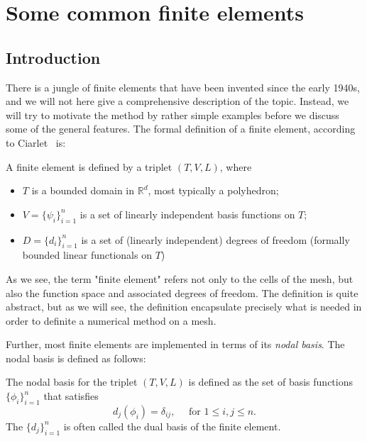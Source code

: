 \chapter{Some common finite elements}
\label{element}

\section{Introduction}

There is a jungle of finite elements that have been invented since the early 1940s, and we
will not here give a comprehensive description of the topic. Instead, we will try to motivate
the method by rather simple examples before we discuss some of the general features. 
The formal definition of a finite element, according to Ciarlet~\cite{ciarlet2002finite} is: 

\begin{defin}
A finite element is defined by a triplet $(T, V, L)$, where 
\begin{itemize}
\item $T$ is a bounded domain in $\mathbb{R}^d$, most typically a polyhedron; 
\item $V = \{\psi_i\}_{i=1}^n$ is a set of linearly independent basis functions on $T$; 
\item $D = \{d_i\}^n_{i=1}$ is a set of (linearly independent) 
  degrees of freedom (formally bounded linear functionals on $T$) 
\end{itemize}
\end{defin}
As we see, the term "finite element" refers not only to the cells of the mesh, but also the function space and associated degrees of freedom. The definition is quite abstract, but as we will see, the definition encapsulate precisely what is needed in order to definite a numerical method on a mesh. 

Further, most finite elements are implemented in terms of its \emph{nodal basis}. The nodal basis is defined as follows: 
\begin{defin}
\label{nodal:basis}
The nodal basis for the triplet  $(T, V, L)$ is defined as the set of basis functions
$\{\phi_i\}^n_{i=1}$ that satisfies  
\[
	d_j(\phi_i) = \delta_{ij}, \quad \mbox{ for } 1 \le i,j \le n. 
\]
The $\{d_j\}^n_{i=1}$ is often called the dual basis of the finite element.  
\end{defin}

